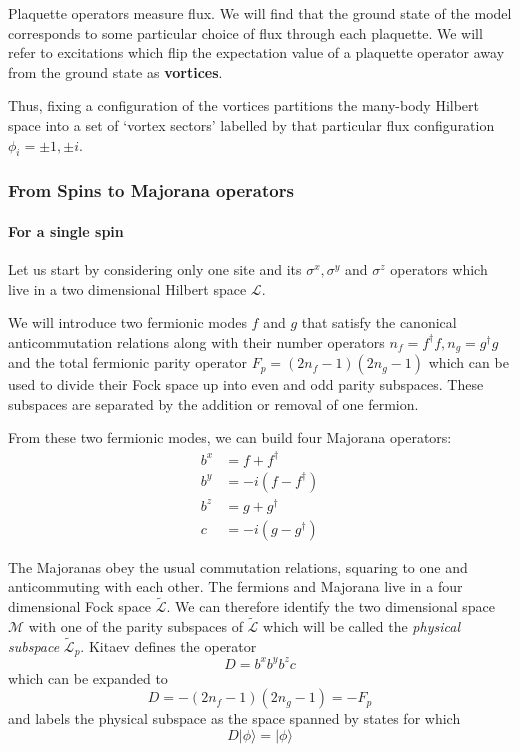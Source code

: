 Plaquette operators measure flux. We will find that the ground state of the model corresponds to some particular choice of flux through each plaquette. We will refer to excitations which flip the expectation value of a plaquette operator away from the ground state as \textbf{vortices}.

Thus, fixing a configuration of the vortices partitions the many-body Hilbert space into a set of `vortex sectors' labelled by that particular flux configuration \(\phi_i = \pm 1,\pm i\).

\hypertarget{from-spins-to-majorana-operators}{%
\subsubsection{From Spins to Majorana operators}\label{from-spins-to-majorana-operators}}

\hypertarget{for-a-single-spin}{%
\paragraph{For a single spin}\label{for-a-single-spin}}

Let us start by considering only one site and its \(\sigma^x, \sigma^y\) and \(\sigma^z\) operators which live in a two dimensional Hilbert space \(\mathcal{L}\).

We will introduce two fermionic modes \(f\) and \(g\) that satisfy the canonical anticommutation relations along with their number operators \(n_f = f^\dagger f, n_g = g^\dagger g\) and the total fermionic parity operator \(F_p = (2n_f - 1)(2n_g - 1)\) which can be used to divide their Fock space up into even and odd parity subspaces. These subspaces are separated by the addition or removal of one fermion.

From these two fermionic modes, we can build four Majorana operators: \[\begin{aligned}
b^x &= f + f^\dagger\\
b^y &= -i(f - f^\dagger)\\
b^z &= g + g^\dagger\\
c   &= -i(g - g^\dagger)
\end{aligned}\]

The Majoranas obey the usual commutation relations, squaring to one and anticommuting with each other. The fermions and Majorana live in a four dimensional Fock space \(\mathcal{\tilde{L}}\). We can therefore identify the two dimensional space \(\mathcal{M}\) with one of the parity subspaces of \(\mathcal{\tilde{L}}\) which will be called the \emph{physical subspace} \(\mathcal{\tilde{L}}_p\). Kitaev defines the operator \[D = b^xb^yb^zc\] which can be expanded to \[D = -(2n_f - 1)(2n_g - 1) = -F_p\] and labels the physical subspace as the space spanned by states for which \[ D|\phi\rangle = |\phi\rangle\]

